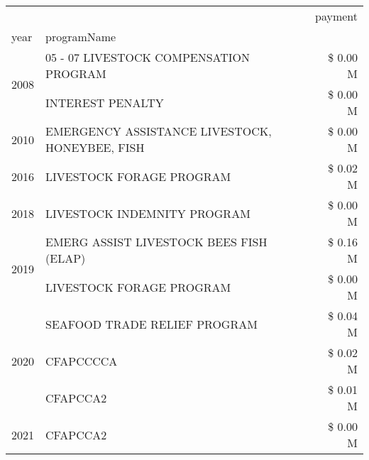 \begin{tabular}{llr}
\toprule
 &  & payment \\
year & programName &  \\
\midrule
\multirow[t]{2}{*}{2008} & 05 - 07 LIVESTOCK COMPENSATION PROGRAM & \$ 0.00 M \\
 & INTEREST PENALTY & \$ 0.00 M \\
\cline{1-3}
2010 & EMERGENCY ASSISTANCE LIVESTOCK, HONEYBEE, FISH & \$ 0.00 M \\
\cline{1-3}
2016 & LIVESTOCK FORAGE PROGRAM & \$ 0.02 M \\
\cline{1-3}
2018 & LIVESTOCK INDEMNITY PROGRAM & \$ 0.00 M \\
\cline{1-3}
\multirow[t]{2}{*}{2019} & EMERG ASSIST LIVESTOCK BEES FISH (ELAP) & \$ 0.16 M \\
 & LIVESTOCK FORAGE PROGRAM & \$ 0.00 M \\
\cline{1-3}
\multirow[t]{3}{*}{2020} & SEAFOOD TRADE RELIEF PROGRAM & \$ 0.04 M \\
 & CFAPCCCCA & \$ 0.02 M \\
 & CFAPCCA2 & \$ 0.01 M \\
\cline{1-3}
2021 & CFAPCCA2 & \$ 0.00 M \\
\cline{1-3}
\bottomrule
\end{tabular}
